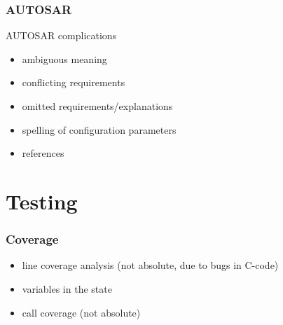 \documentclass{beamer}
\begin{document}

\begin{frame}
  \frametitle{AUTOSAR}
  AUTOSAR complications
  \begin{itemize}
    \item ambiguous meaning
    \item conflicting requirements
    \item omitted requirements/explanations
    \item spelling of configuration parameters
    \item references
  \end{itemize}
\end{frame}

\section{Testing}

\begin{frame}
  \frametitle{Coverage}
  \begin{itemize}
    \item line coverage analysis (not absolute, due to bugs in C-code)
    \item variables in the state
    \item call coverage (not absolute)
  \end{itemize}
\end{frame}

\end{document}
